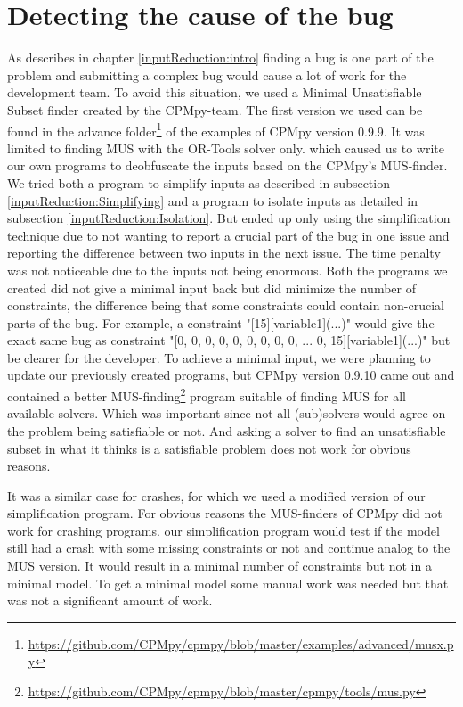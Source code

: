 \section{Detecting the cause of the bug}
\label{impl:DetectingCause}
As describes in chapter \ref{inputReduction:intro} finding a bug is one part of the problem and submitting a complex bug would cause a lot of work for the development team. To avoid this situation, we used a Minimal Unsatisfiable Subset finder created by the CPMpy-team. The first version we used can be found in the advance folder\footnote{\url{https://github.com/CPMpy/cpmpy/blob/master/examples/advanced/musx.py}} of the examples of CPMpy version 0.9.9. It was limited to finding MUS with the OR-Tools solver only. which caused us to write our own programs to deobfuscate the inputs based on the CPMpy's MUS-finder. We tried both a program to simplify inputs as described in subsection \ref{inputReduction:Simplifying} and a program to isolate inputs as detailed in subsection \ref{inputReduction:Isolation}. But ended up only using the simplification technique due to not wanting to report a crucial part of the bug in one issue and reporting the difference between two inputs in the next issue. The time penalty was not noticeable due to the inputs not being enormous. Both the programs we created did not give a minimal input back but did minimize the number of constraints, the difference being that some constraints could contain non-crucial parts of the bug. For example, a constraint "[15][variable1](...)" would give the exact same bug as constraint "[0, 0, 0, 0, 0, 0, 0, 0, 0, ... 0, 15][variable1](...)" but be clearer for the developer. To achieve a minimal input, we were planning to update our previously created programs, but CPMpy version 0.9.10 came out and contained a better MUS-finding\footnote{\url{https://github.com/CPMpy/cpmpy/blob/master/cpmpy/tools/mus.py}} program  suitable of finding MUS for all available solvers. Which was important since not all (sub)solvers would agree on the problem being satisfiable or not. And asking a solver to find an unsatisfiable subset in what it thinks is a satisfiable problem does not work for obvious reasons. 


It was a similar case for crashes, for which we used a modified version of our simplification program. For obvious reasons the MUS-finders of CPMpy did not work for crashing programs. our simplification program would test if the model still had a crash with some missing constraints or not and continue analog to the MUS version. It would result in a minimal number of constraints but not in a minimal model. To get a minimal model some manual work was needed but that was not a significant amount of work. 

